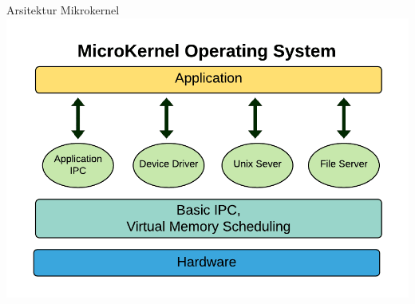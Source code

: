 \documentclass[aspectratio=169, table]{beamer}
\begin{document}

    \begin{frame}{Arsitektur Mikrokernel}
        \centering
        \includegraphics[width=1\textheight]{Mikrokernel-1.png}
    \end{frame}
\end{document}
